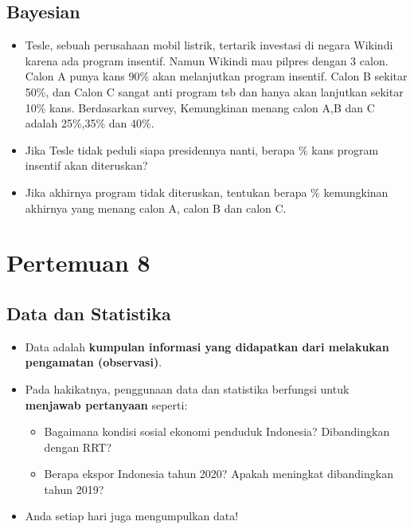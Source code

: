 \documentclass[
  letterpaper,
  DIV=11,
  numbers=noendperiod]{scrartcl}
\begin{document}
\hypertarget{bayesian-2}{%
\subsection{Bayesian}\label{bayesian-2}}

\begin{itemize}
\item
  Tesle, sebuah perusahaan mobil listrik, tertarik investasi di negara
  Wikindi karena ada program insentif. Namun Wikindi mau pilpres dengan
  3 calon. Calon A punya kans 90\% akan melanjutkan program insentif.
  Calon B sekitar 50\%, dan Calon C sangat anti program tsb dan hanya
  akan lanjutkan sekitar 10\% kans. Berdasarkan survey, Kemungkinan
  menang calon A,B dan C adalah 25\%,35\% dan 40\%.
\item
  Jika Tesle tidak peduli siapa presidennya nanti, berapa \% kans
  program insentif akan diteruskan?
\item
  Jika akhirnya program tidak diteruskan, tentukan berapa \% kemungkinan
  akhirnya yang menang calon A, calon B dan calon C.
\end{itemize}

\hypertarget{pertemuan-8}{%
\section{Pertemuan 8}\label{pertemuan-8}}

\hypertarget{data-dan-statistika}{%
\subsection{Data dan Statistika}\label{data-dan-statistika}}

\begin{itemize}
\item
  Data adalah \textbf{kumpulan informasi yang didapatkan dari melakukan
  pengamatan (observasi)}.
\item
  Pada hakikatnya, penggunaan data dan statistika berfungsi untuk
  \textbf{menjawab pertanyaan} seperti:

  \begin{itemize}
  \item
    Bagaimana kondisi sosial ekonomi penduduk Indonesia? Dibandingkan
    dengan RRT?
  \item
    Berapa ekspor Indonesia tahun 2020? Apakah meningkat dibandingkan
    tahun 2019?
  \end{itemize}
\item
  Anda setiap hari juga mengumpulkan data!
\end{itemize}
\end{document}
